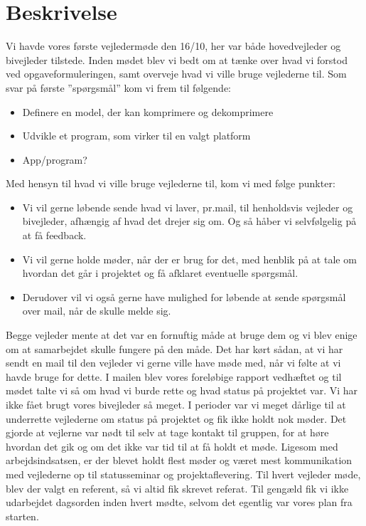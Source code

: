 \section{Beskrivelse}
Vi havde vores første vejledermøde den 16/10, her var både hovedvejleder og bivejleder tilstede. Inden mødet blev vi bedt om at tænke over hvad vi forstod ved opgaveformuleringen, samt overveje hvad vi ville bruge vejlederne til. 
Som svar på første ”spørgsmål” kom vi frem til følgende:
\begin{itemize}
\item	Definere en model, der kan komprimere og dekomprimere

\item Udvikle et program, som virker til en valgt platform

\item	App/program?
\end{itemize}
Med hensyn til hvad vi ville bruge vejlederne til, kom vi med følge punkter:
\begin{itemize}
\item	Vi vil gerne løbende sende hvad vi laver, pr.mail, til henholdsvis vejleder og bivejleder, afhængig af hvad det drejer sig om. Og så håber vi selvfølgelig på at få feedback.

\item	 Vi vil gerne holde møder, når der er brug for det, med henblik på at tale om hvordan det går i projektet og få afklaret eventuelle spørgsmål.

\item	Derudover vil vi også gerne have mulighed for løbende at sende spørgsmål over mail, når de skulle melde sig.
\end{itemize}Begge vejleder mente at det var en fornuftig måde at bruge dem og vi blev enige om at samarbejdet skulle fungere på den måde. Det har kørt sådan, at vi har sendt en mail til den vejleder vi gerne ville have møde med, når vi følte at vi havde bruge for dette. I mailen blev vores foreløbige rapport vedhæftet og til mødet talte vi så om hvad vi burde rette og hvad status på projektet var. Vi har ikke fået brugt vores bivejleder så meget. I perioder var vi meget dårlige til at underrette vejlederne om status på projektet og fik ikke holdt nok møder. Det gjorde at vejlerne var nødt til selv at tage kontakt til gruppen, for at høre hvordan det gik og om det ikke var tid til at få holdt et møde. Ligesom med arbejdsindsatsen, er der blevet holdt flest møder og været mest kommunikation med vejlederne op til statusseminar og projektaflevering. 
Til hvert vejleder møde, blev der valgt en referent, så vi altid fik skrevet referat. Til gengæld fik vi ikke udarbejdet dagsorden inden hvert mødte, selvom det egentlig var vores plan fra starten. 

